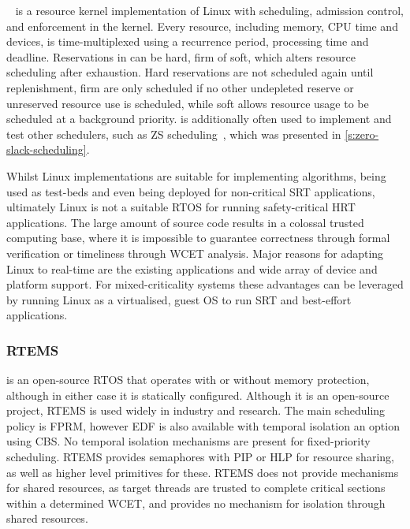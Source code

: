 \linuxrk~\citep{Oikawa_Rajkumar_98} is a resource kernel implementation of Linux with scheduling,
admission control, and enforcement in the kernel. Every resource, including memory, CPU time and
devices, is 
time-multiplexed using a recurrence period, processing time and deadline. Reservations in \linuxrk
can be hard, firm of soft, which alters resource scheduling after exhaustion. Hard
reservations are not scheduled again until replenishment, firm are only scheduled if no other
undepleted reserve or unreserved resource use is scheduled, while soft allows resource usage to be
scheduled at a background priority. \linuxrk is additionally often used to implement and test other
schedulers, such as \Gls{ZS} scheduling~\citep{deNiz_LR_09}, which was presented in
\cref{s:zero-slack-scheduling}.
 
Whilst Linux implementations are suitable for implementing algorithms, being used as test-beds and
even being deployed for non-critical \gls{SRT} applications, ultimately Linux is not a suitable
\gls{RTOS} for running safety-critical \gls{HRT} applications. The large amount of source code
results in a colossal trusted computing base, where it is impossible to guarantee correctness through
formal verification or timeliness through {\gls{WCET}} analysis.  Major reasons for adapting Linux
to real-time are the existing applications and wide array of device and platform support. For
mixed-criticality systems these advantages can be leveraged by running Linux as a virtualised, guest \gls{OS} to run \gls{SRT}
and best-effort applications.

\subsubsection{RTEMS}

\citet{RTEMS:URL} is an open-source \gls{RTOS} that operates with or without memory protection,
although in either case it is statically configured.  Although it is an open-source project, RTEMS
is used widely in industry and research.  The main scheduling policy is \gls{FPRM}, however
\gls{EDF} is also available with temporal isolation an option using \gls{CBS}.  No temporal
isolation mechanisms are present for fixed-priority scheduling.  RTEMS provides semaphores with
\gls{PIP} or \gls{HLP} for resource sharing, as well as higher level primitives for these. RTEMS
does not provide mechanisms for shared resources, as target threads are trusted to complete critical
sections within a determined \gls{WCET}, and provides no mechanism for isolation through shared
resources.

